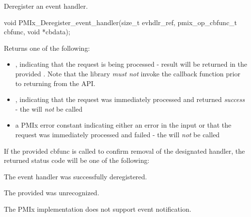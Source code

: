 \summary

Deregister an event handler.

\format

\cspecificstart
\begin{codepar}
void
PMIx_Deregister_event_handler(size_t evhdlr_ref,
                              pmix_op_cbfunc_t cbfunc,
                              void *cbdata);
\end{codepar}
\cspecificend

\begin{arglist}
\end{arglist}

Returns one of the following:
\begin{itemize}
\item {}, indicating that the request is being processed - result will be returned in the provided . Note that the library \emph{must not} invoke the callback function prior to returning from the \ac{API}.
\item {}, indicating that the request was immediately processed and returned \textit{success} - the  will \textit{not} be called
\item a PMIx error constant indicating either an error in the input or that the request was immediately processed and failed - the  will \textit{not} be called
\end{itemize}

If the provided cbfunc is called to confirm removal of the designated handler, the returned status code will be one of the following:

\begin{constantdesc}
\item {} The event handler was successfully deregistered.
\item {} The provided  was unrecognized.
\item {} The \ac{PMIx} implementation does not support event notification.
\end{constantdesc}

\descr


